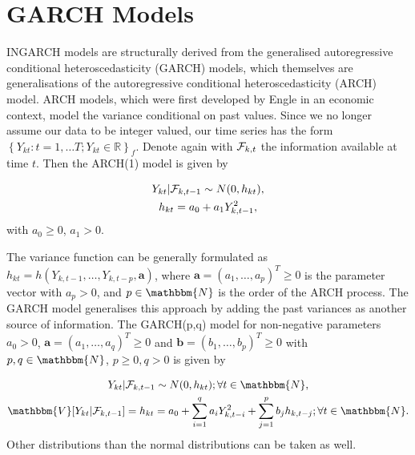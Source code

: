 
\section{GARCH Models}
\label{sec: Garch Models}

INGARCH models are structurally derived from the generalised autoregressive conditional heteroscedasticity (GARCH) models, which themselves are generalisations of the autoregressive conditional heteroscedasticity (ARCH) model. ARCH models, which were first developed by Engle \textcite{Engle:1982} in an economic context, model the variance conditional on past values. Since we no longer assume our data to be integer valued, our time series has the form $\left\{Y_{kt}:t=1,\ldots T; Y_{kt} \in \mathbb{R}\right\}_f$. Denote again with $\mathcal{F}_{k,t}$ the information available at time $t$. Then the ARCH(1) model is given by \textcite{Engle:1982}

\begin{equation}
\begin{gathered}
Y_{kt} | \mathcal{F}_{k,t-1} \sim N(0,h_{kt}),\\
h_{kt} = a_0 + a_1 Y_{k,t-1}^2,
\label{eq:ARCH model}
\end{gathered}
\end{equation}
%
with $a_0\geq0$, $a_1>0$. 

The variance function can be generally formulated as $h_{kt} = h(Y_{k,t-1},\ldots,Y_{k,t-p},\bm{a})$, where $\bm{a}=(a_1,\ldots,a_p)^T\geq 0$ is the parameter vector with $a_p>0$, and $p \in \mathbbm{N}$ is the order of the ARCH process. 
The GARCH model generalises this approach by adding the past variances as another source of information. The GARCH(p,q) model for non-negative parameters $a_0>0$, $\bm{a}=(a_1,\ldots,a_q)^T\geq 0$ and $\bm{b}=(b_1,\ldots,b_p)^T\geq0$ with $p,q \in \mathbbm{N}$, $p\geq0, q>0$ is given by \textcite{Bollerslev:1986}

\begin{equation}
\begin{gathered}
Y_{kt} | \SigA_{k,t-1} \sim N(0,h_{kt}); \forall t \in \mathbbm{N}, \\
\mathbbm{V}[Y_{kt}|\SigA_{k,t-1}]=h_{kt} = a_0 + \sum_{i=1}^q a_i Y_{k,t-i}^2 + \sum_{j=1}^p b_j h_{k,t-j};\forall t \in \mathbbm{N}.
\label{eq:GARCH model}
\end{gathered}
\end{equation}
%
Other distributions than the normal distributions can be taken as well. 

